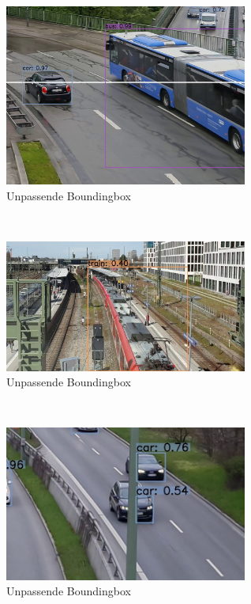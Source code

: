 \documentclass[conference]{IEEEtran}
\begin{document}
	\begin{figure}[!h]
		\begin{center}
			\includegraphics[width=8cm]{Media/Output_777 - Kopie.jpg}
			\caption{Unpassende Boundingbox}
			\label{UB}
		\end{center}
	\end{figure}\\
	\begin{figure}[!h]
		\begin{center}
			\includegraphics[width=8cm]{Media/Output_2126.jpg}
			\caption{Unpassende Boundingbox}
			\label{UB4}
		\end{center}
	\end{figure}\\
	\begin{figure}[!h]
		\begin{center}
			\includegraphics[width=8cm]{Media/Output_276 - Kopie.jpg}
			\caption{Unpassende Boundingbox}
			\label{UB2}
		\end{center}
	\end{figure}\\
\end{document}
